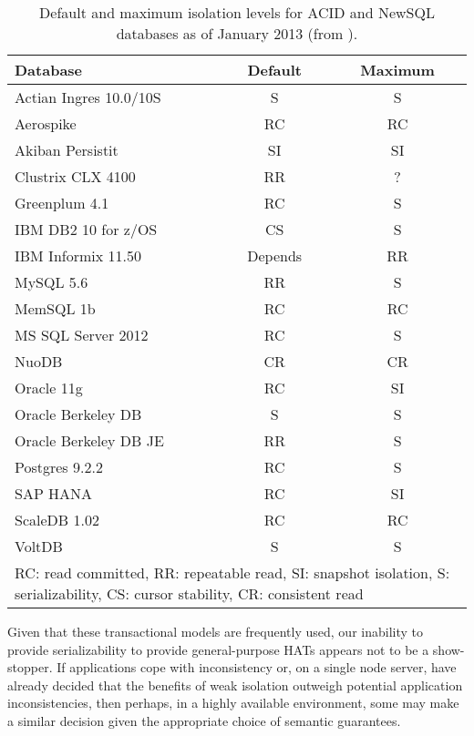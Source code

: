 \begin{table}
\begin{small}
\begin{tabular}{|l|c|c|}
\hline
Database & Default & Maximum\\\hline
Actian Ingres 10.0/10S~\cite{actian-docs} & S & S\\
Aerospike~\cite{aerospike-docs} & RC & RC\\
Akiban Persistit~\cite{akiban-docs} & SI & SI\\
Clustrix CLX 4100~\cite{clustrix-docs} & RR & ?\\
Greenplum 4.1~\cite{greenplum-docs} & RC & S \\
IBM DB2 10 for z/OS~\cite{db2-docs} & CS & S\\
IBM Informix 11.50~\cite{informix-docs} & Depends & RR\\
MySQL 5.6~\cite{innodb-docs} & RR & S \\
MemSQL 1b~\cite{memsql-docs} & RC & RC\\
MS SQL Server 2012~\cite{ms-sql-docs} & RC & S \\
NuoDB~\cite{nuodb-docs} & CR & CR\\
Oracle 11g~\cite{oracle-docs} & RC & SI\\
Oracle Berkeley DB~\cite{bdb-reg-docs} & S & S\\
Oracle Berkeley DB JE~\cite{bdb-je-docs} & RR & S\\
Postgres 9.2.2~\cite{postgres-docs} & RC & S\\
SAP HANA~\cite{hana-docs} & RC & SI\\
ScaleDB 1.02~\cite{scaledb-docs} & RC & RC\\
VoltDB~\cite{voltdb-docs} & S & S\\
\hline
\multicolumn{3}{|p{7cm}|}{{\footnotesize RC: read committed, RR: repeatable read, SI: snapshot isolation, S: serializability, CS: cursor stability, CR: consistent read}}\\\hline

\end{tabular}
\caption{Default and maximum isolation levels for ACID and NewSQL
  databases as of January 2013 (from
  \protect\cite{needed-hotos}).}\vspace{-1.5em}
\label{table:existing}
\end{small}
\end{table}

Given that these transactional models are frequently used, our
inability to provide serializability to provide general-purpose HATs
appears not to be a show-stopper. If applications cope with
inconsistency or, on a single node server, have already decided that
the benefits of weak isolation outweigh potential application
inconsistencies, then perhaps, in a highly available environment, some
may make a similar decision given the appropriate choice of semantic
guarantees.


